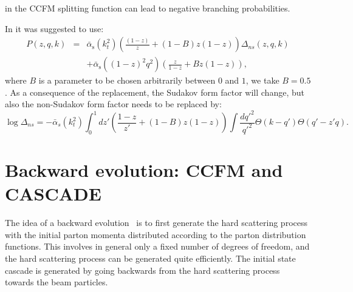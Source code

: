 \documentclass[11pt]{article} \usepackage{mystyle-new}
\newcommand{\asb}{{\bar \alpha}_\mathrm{s}}
\newcommand{\kt}{k_{t}}
\begin{document}
in the CCFM splitting function can lead to negative
branching probabilities. 
\par
In \cite{smallx:2001} it was suggested to use:
\vspace*{-0.2cm}
\begin{eqnarray}
P(z,q,k)& = &\asb \left(\kt^2\right) \left( \frac{(1-z)}{z} + (1-B)z(1-z)\right)
\Delta_{ns}(z,q,k) \label{Pgg_fullsplitt}
\\
& &  + \asb\left((1-z)^2q^2\right) \left(\frac{z}{1-z} + Bz(1-z)\right),
\nonumber
\end{eqnarray}
where $B$ is a parameter to be chosen arbitrarily between $0$ and $1$,
we take $B=0.5$. 
As a consequence of the replacement, the Sudakov form factor will change, but 
also the non-Sudakov form factor needs to be replaced by:
\begin{equation}
\log\Delta_{ns} =  -{\bar \alpha}_s\left(\kt^2\right)
                  \int_0^1 dz'
                        \left( \frac{1-z}{z'} + (1-B)z(1-z) \right)
                        \int \frac{d {q'}^2}{{q'}^2} 
              \Theta(k-q')\Theta(q'-z'q).
\label{non_sudakov_fullsplitt}
\end{equation}

\section{Backward evolution: CCFM and CASCADE }
\label{sec:Backward}

 
The idea of a backward evolution~\cite{PYTHIAPSa,LEPTOPS}
is to first generate the hard
scattering process with the initial parton momenta distributed
according to the parton distribution functions.  This involves in
general only a fixed number of degrees of freedom, and the hard
scattering process can be generated quite efficiently. The
initial state cascade is generated by going backwards from the hard
scattering process towards the beam particles. 
\end{document}
